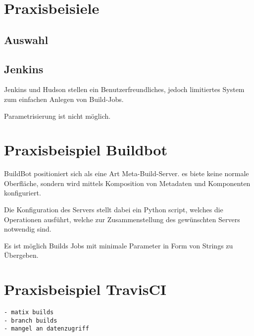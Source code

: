 \section{Praxisbeisiele}

\subsection{Auswahl}
\subsection{Jenkins}

Jenkins und Hudson stellen ein Benutzerfreundliches,
jedoch limitiertes System zum einfachen Anlegen von Build-Jobs.

Parametrisierung ist nicht möglich.

\section{Praxisbeispiel Buildbot}

BuildBot positioniert sich als eine Art Meta-Build-Server.
es biete keine normale Oberfläche, sondern wird mittels
Komposition von Metadaten und Komponenten konfiguriert.

Die Konfiguration des Servers stellt dabei ein Python script,
welches die Operationen ausführt, welche zur Zusammenstellung des gewünschten Servers notwendig sind.

Es ist möglich Builds Jobs mit minimale Parameter in Form von Strings zu Übergeben.

\section{Praxisbeispiel TravisCI}

\begin{verbatim}
- matix builds
- branch builds
- mangel an datenzugriff
\end{verbatim}
